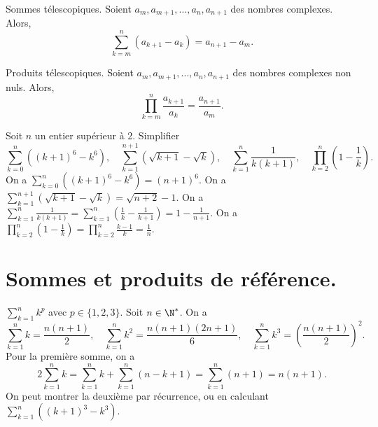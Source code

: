 \documentclass[11pt]{article}
\begin{document}
\begin{thm}{Sommes télescopiques.}{}
    Soient $a_m,a_{m+1},...,a_n,a_{n+1}$ des nombres complexes. Alors,
    \begin{equation*}
        \sum_{k=m}^n(a_{k+1}-a_k)=a_{n+1}-a_m.
    \end{equation*}
\end{thm}

\begin{prop}{Produits télescopiques.}{}
    Soient $a_m,a_{m+1},...,a_n,a_{n+1}$ des nombres complexes non nuls. Alors,
    \begin{equation*}
        \prod_{k=m}^n\frac{a_{k+1}}{a_k}=\frac{a_{n+1}}{a_m}.
    \end{equation*}
\end{prop}

\begin{ex}{}{}
    Soit $n$ un entier supérieur à 2. Simplifier
    \begin{equation*}
        \sum_{k=0}^n((k+1)^6-k^6), \quad \sum_{k=1}^{n+1}(\sqrt{k+1}-\sqrt{k}),\quad \sum_{k=1}^n\frac{1}{k(k+1)},\quad\prod_{k=2}^n\left( 1-\frac{1}{k} \right).
    \end{equation*}
    \tcblower
     On a $\sum_{k=0}^n((k+1)^6-k^6)=(n+1)^6$.\n
     On a $\sum_{k=1}^{n+1}(\sqrt{k+1}-\sqrt{k})=\sqrt{n+2}-1$.\n
     On a $\sum_{k=1}^n\frac{1}{k(k+1)}=\sum_{k=1}^n(\frac{1}{k}-\frac{1}{k+1})=1-\frac{1}{n+1}$.\n
     On a $\prod_{k=2}^n\left( 1-\frac{1}{k} \right)=\prod_{k=2}^n\frac{k-1}{k}=\frac{1}{n}$.
\end{ex}

\section{Sommes et produits de référence.}

\begin{prop}{$\sum_{k=1}^nk^p$ avec $p\in\{1,2,3\}$.}{}
    Soit $n\in\N^*$. On a
    \begin{equation*}
        \sum_{k=1}^nk=\frac{n(n+1)}{2},\quad\sum_{k=1}^nk^2=\frac{n(n+1)(2n+1)}{6},\quad\sum_{k=1}^nk^3=\left( \frac{n(n+1)}{2} \right)^2.
    \end{equation*}
    \tcblower
    Pour la première somme, on a
    \begin{equation*}
        2\sum_{k=1}^nk=\sum_{k=1}^nk+\sum_{k=1}^n(n-k+1)=\sum_{k=1}^n(n+1)=n(n+1).
    \end{equation*}
    On peut montrer la deuxième par récurrence, ou en calculant $\sum_{k=1}^n((k+1)^3-k^3)$.
\end{prop}
\end{document}
